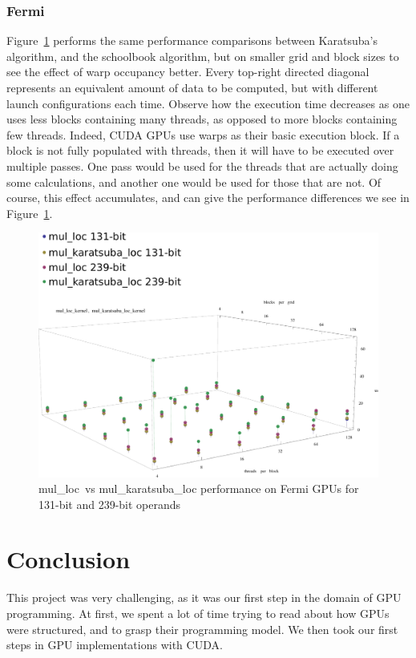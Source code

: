 \documentclass[12pt, a4paper]{report}
\begin{document}
\begin{sloppypar}
\subsection{Fermi}
Figure~\ref{fig:mul_loc_vs_mul_karatsuba_loc_fermi_131_vs_239_duration} performs the same
performance comparisons between Karatsuba's algorithm, and the schoolbook algorithm, but on smaller
grid and block sizes to see the effect of warp occupancy better.
Every top-right directed diagonal represents an equivalent amount of data to be
computed, but with different launch configurations each time.
Observe how the execution time decreases as one uses less blocks containing many threads,
as opposed to more blocks containing few threads.
Indeed, CUDA GPUs use warps as their basic execution block.
If a block is not fully populated with threads, then it will have to be executed
over multiple passes.
One pass would be used for the threads that are actually doing some calculations,
and another one would be used for those that are not.
Of course, this effect accumulates, and can give the performance differences we
see in Figure~\ref{fig:mul_loc_vs_mul_karatsuba_loc_fermi_131_vs_239_duration}.
\begin{figure}[h]
\centering
\includegraphics[scale=0.5]{figs/mul_loc_vs_mul_karatsuba_loc_fermi_131_vs_239_duration}
\caption{mul\_loc\ vs mul\_karatsuba\_loc performance on Fermi GPUs for 131-bit and 239-bit operands}
\label{fig:mul_loc_vs_mul_karatsuba_loc_fermi_131_vs_239_duration}
\end{figure}

\chapter{Conclusion}
This project was very challenging, as it was our first step in the domain of GPU programming.
At first, we spent a lot of time trying to read about how GPUs were structured, and to grasp their
programming model.
We then took our first steps in GPU implementations with CUDA.


\end{sloppypar}
\end{document}
